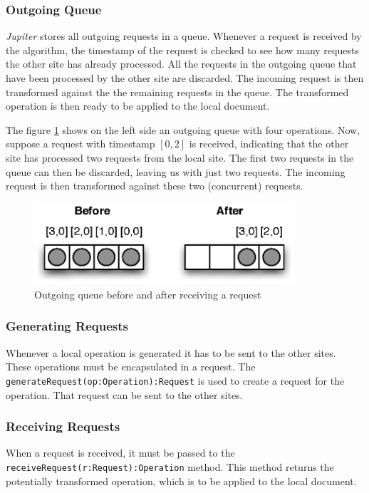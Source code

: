\subsubsection{Outgoing Queue}
\emph{Jupiter} stores all outgoing requests in a queue. Whenever a request
is received by the algorithm, the timestamp of the request is checked to
see how many requests the other site has already processed. All the requests
in the outgoing queue that have been processed by the other site are discarded.
The incoming request is then transformed against the the remaining requests
in the queue. The transformed operation is then ready to be applied to the
local document.

The figure \ref{fig:algorithm.outqueue} shows on the left side an outgoing
queue with four operations. Now, suppose a request with timestamp $[0,2]$
is received, indicating that the other site has processed two requests
from the local site. The first two requests in the queue can then be
discarded, leaving us with just two requests. The incoming request is then
transformed against these two (concurrent) requests.

\begin{figure}[H]
\centering
\includegraphics[height=3.03cm,width=9.67cm]{../images/finalreport/algorithm_outqueue.eps}
\caption{Outgoing queue before and after receiving a request}
\label{fig:algorithm.outqueue}
\end{figure}

\subsubsection{Generating Requests}
Whenever a local operation is generated it has to be sent to the other sites.
These operations must be encapsulated in a request. The
\texttt{generateRequest(op:Operation):Request} is used to create a request
for the operation. That request can be sent to the other sites.

\subsubsection{Receiving Requests}
When a request is received, it must be passed to the
\texttt{receiveRequest(r:Request):Operation} method. This method returns
the potentially transformed operation, which is to be applied to the
local document.

